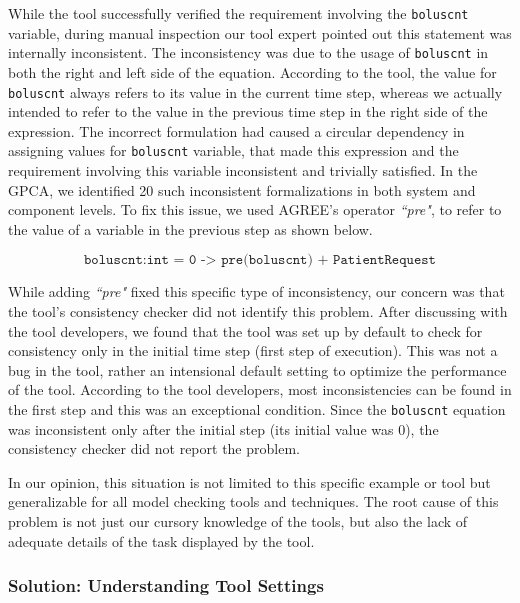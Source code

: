 While the tool successfully verified the requirement involving the \texttt{boluscnt} variable, during manual inspection our tool expert pointed out this statement was internally inconsistent. The inconsistency was due to the usage of \texttt{boluscnt} in both the right and left side of the equation. According to the tool, the value for \texttt{boluscnt} always refers to its value in the current time step, whereas we actually intended to refer to the value in the previous time step in the right side of the expression. The incorrect formulation had caused a circular dependency in assigning values for \texttt{boluscnt} variable, that made this expression and the requirement involving this variable inconsistent and trivially satisfied. In the GPCA, we identified 20 such inconsistent formalizations in both system and component levels. To fix this issue, we used AGREE's operator \emph{``pre"}, to refer to the value of a variable in the previous step as shown below.

$$ \texttt{boluscnt:int = 0 -> pre(boluscnt) + PatientRequest} $$

While adding \emph{``pre"} fixed this specific type of inconsistency, our concern was that the tool's consistency checker did not identify this problem. After discussing with the tool developers, we found that the tool was set up by default to check for consistency only in the initial time step (first step of execution). This was not a bug in the tool, rather an intensional default setting to optimize the performance of the tool. According to the tool developers, most inconsistencies can be found in the first step and this was an exceptional condition. Since the \texttt{boluscnt} equation was inconsistent only after the initial step (its initial value was 0), the consistency checker did not report the problem.

In our opinion, this situation is not limited to this specific example or tool but generalizable for all model checking tools and techniques. The root cause of this problem is not just our cursory knowledge of the tools, but also the lack of adequate details of the task displayed by the tool.


\subsubsection {Solution: Understanding Tool Settings}

